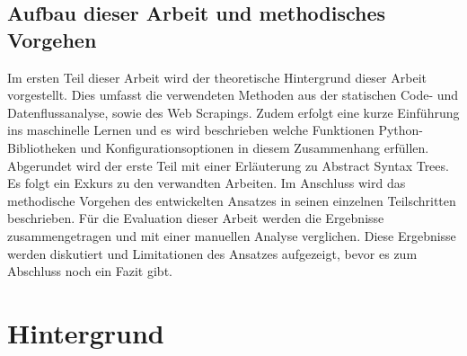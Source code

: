 \documentclass[german,bachelor]{swsLeipzig}
\begin{document}
\section{Aufbau dieser Arbeit und methodisches Vorgehen}
Im ersten Teil dieser Arbeit wird der theoretische Hintergrund dieser Arbeit vorgestellt.
Dies umfasst die verwendeten Methoden aus der statischen Code- und Datenflussanalyse, sowie des Web Scrapings.
Zudem erfolgt eine kurze Einführung ins maschinelle Lernen und es wird beschrieben welche Funktionen Python-Bibliotheken und
Konfigurationsoptionen in diesem Zusammenhang erfüllen.
Abgerundet wird der erste Teil mit einer Erläuterung zu Abstract Syntax Trees.
Es folgt ein Exkurs zu den verwandten Arbeiten.
Im Anschluss wird das methodische Vorgehen des entwickelten Ansatzes in seinen einzelnen Teilschritten beschrieben.
Für die Evaluation dieser Arbeit werden die Ergebnisse zusammengetragen und mit einer manuellen Analyse verglichen.
Diese Ergebnisse werden diskutiert und Limitationen des Ansatzes aufgezeigt, bevor es zum Abschluss noch ein Fazit gibt.


\chapter{Hintergrund}\label{Hintergrund}
\end{document}
